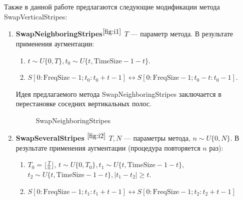 \documentclass[12pt, fleqn]{article}
\begin{document}
Также в данной работе предлагаются следующие модификации метода \newline
SwapVerticalStripes:

\begin{enumerate}
    \item \textbf{SwapNeighboringStripes}$^{\ref{fig:i1}}$ \newline
        $T$ --- параметр метода. В результате применения аугментации:
        \begin{enumerate}
            \item $t \sim U\{0, T\}, t_0 \sim U\{t, \text{TimeSize} - 1 - t\}.$
            \item $S[0:\text{FreqSize} - 1; t_0: t_0 + t - 1] \leftrightarrow S[0:\text{FreqSize} - 1; t_0 - t: t_0 - 1].$
        \end{enumerate}
        Идея предлагаемого метода SwapNeighboringStripes заключается в перестановке соседних вертикальных полос.
    	\begin{figure}[ht!]
    	\caption{SwapNeighboringStripes}
    	\label{fig:i1}
        \end{figure}
    \item \textbf{SwapSeveralStripes} $^{\ref{fig:i2}}$ \newline
        $T, N$ --- параметры метода, \newline
        $n \sim U\{0, N\}$. \newline
    	В результате применения аугментации (процедура повторяется $n$ раз):
    	\begin{enumerate}
    	    \item $T_0 = \lfloor \frac{T}{n} \rfloor$, $t \sim U\{0, T_0\}, t_1 \sim U\{t, \text{TimeSize} - 1 - t\},$ \newline $t_2 \sim U\{t, \text{TimeSize} - 1 - t\}, |t_1 - t_2| \geq t$.
    	    \item $S[0:\text{FreqSize} - 1; t_1: t_1 + t - 1] \leftrightarrow S[0:\text{FreqSize} - 1; t_2 : t_2 + t - 1]$

\end{enumerate}
\end{enumerate}
\end{document}
